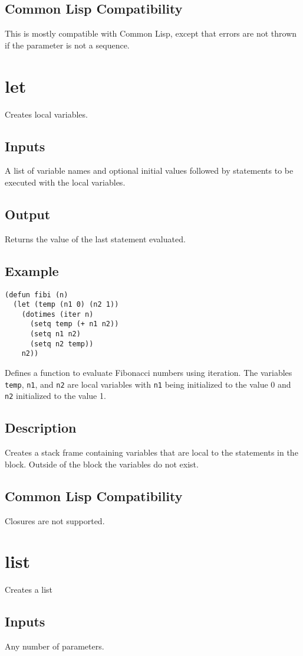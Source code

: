 \documentclass[10pt, openany]{book}
\newcommand{\keyword}[1]{\texttt{#1}}
\newcommand{\cl}{Common Lisp}
\begin{document}
\subsection{Common Lisp Compatibility}
This is mostly compatible with \cl, except that errors are not thrown if the parameter is not a sequence.

\section{let}
Creates local variables.
\subsection{Inputs}
A list of variable names and optional initial values followed by statements to be executed with the local variables.
\subsection{Output}
Returns the value of the last statement evaluated.
\subsection{Example}
\begin{lstlisting}
(defun fibi (n)
  (let (temp (n1 0) (n2 1))
    (dotimes (iter n)
      (setq temp (+ n1 n2))
      (setq n1 n2)
      (setq n2 temp))
    n2))
\end{lstlisting}
Defines a function to evaluate Fibonacci numbers using iteration.  The variables \keyword{temp}, \keyword{n1}, and \keyword{n2} are local variables with \keyword{n1} being initialized to the value 0 and \keyword{n2} initialized to the value 1.
\subsection{Description}
Creates a stack frame containing variables that are local to the statements in the block.  Outside of the block the variables do not exist.
\subsection{Common Lisp Compatibility}
Closures are not supported.

\section{list}
Creates a list
\subsection{Inputs}
Any number of parameters.
\end{document}
